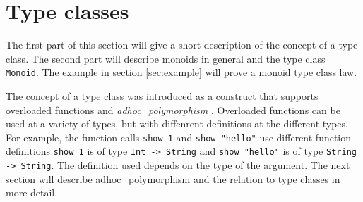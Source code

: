 \section{Type classes}
\label{sec:typeclasses}

The first part of this section will give a short description of the concept of a type class. The second part will describe monoids in general and the type class \verb|Monoid|. The example in section \ref{sec:example} will prove a monoid type class law. 

The concept of a type class was introduced as a construct that supports overloaded functions and \emph{\gls{adhoc_polymorphism}} \cite{Wadler}. Overloaded functions can be used at a variety of types, but with diffenrent definitions at the different types. For example, the function calls \verb|show 1| and \verb|show "hello"| use different \glspl{function-definition} \verb|show 1| is of type \verb|Int -> String| and \verb|show "hello"| is of type \verb|String -> String|. The definition used depends on the type of the argument.  The next section will describe \gls{adhoc_polymorphism} and the relation to type classes in more detail.

